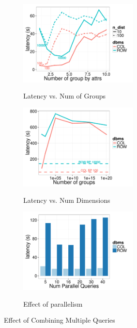 \begin{figure}[t]
	\centering
	\begin{subfigure}{0.33\linewidth}
		\centering
		{\includegraphics[width=6cm] {Images/multi_gb_same.pdf}}
		\caption{Latency vs. Num of Groups}
		\label{fig:multi_gb_same}
	\end{subfigure}
	\begin{subfigure}{0.33\linewidth}
		\centering
		{\includegraphics[width=6cm] {Images/multi_gb.pdf}}
		\caption{Latency vs. Num Dimensions}
		\label{fig:multi_gb_bp}
	\end{subfigure}
	\begin{subfigure}{0.33\linewidth}
		\centering
		{\includegraphics[width=6cm] {Images/parallel_noop.pdf}}
		\caption{Effect of parallelism}
		\label{fig:parallelism}
	\end{subfigure}
	\vspace{-10pt}
	\caption{Effect of Combining Multiple Queries}
	\label{fig:bank_perf}
	\vspace{-10pt}
\end{figure}

